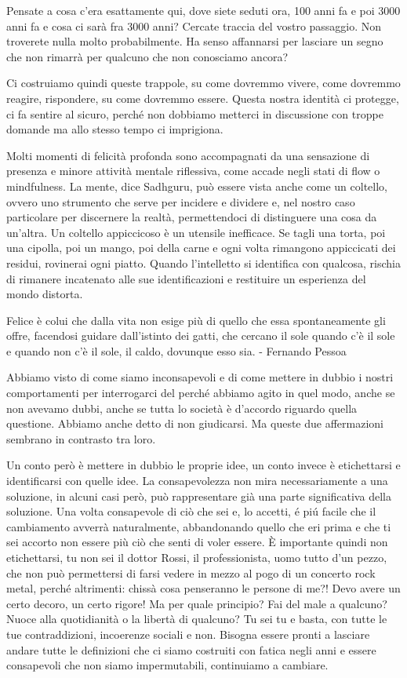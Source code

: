 \documentclass[12pt]{book} %
\begin{document}
\begin{mdframed}[linewidth=1pt]
Pensate a cosa c'era esattamente qui, dove siete seduti ora, 100 anni fa e poi 3000 anni fa e cosa ci sarà fra 3000 anni? Cercate traccia del vostro passaggio. Non troverete nulla molto probabilmente. Ha senso affannarsi per lasciare un segno che non rimarrà per qualcuno che non conosciamo ancora?
\end{mdframed}

Ci costruiamo quindi queste trappole, su come dovremmo vivere, come dovremmo reagire, rispondere, su come dovremmo
essere. Questa nostra identità ci protegge, ci fa sentire al sicuro, perché non dobbiamo metterci in discussione con
troppe domande ma allo stesso tempo ci imprigiona.

Molti momenti di felicità profonda sono accompagnati da una sensazione di presenza e minore attività mentale riflessiva, come accade negli stati di flow o mindfulness. La mente, dice Sadhguru, può essere vista anche come un
coltello, ovvero uno strumento che serve per incidere e dividere e, nel nostro caso particolare per discernere la
realtà, permettendoci di distinguere una cosa da un'altra. Un coltello appiccicoso è un utensile inefficace.
Se tagli una torta, poi una cipolla, poi un mango, poi della carne e ogni volta rimangono appiccicati dei residui,
rovinerai ogni piatto. Quando l'intelletto si identifica con qualcosa, rischia di rimanere incatenato alle
sue identificazioni e restituire un esperienza del mondo distorta.

Felice è colui che dalla vita non esige più di quello che essa spontaneamente gli offre, facendosi guidare dall'istinto
dei gatti, che cercano il sole quando c'è il sole e quando non c'è il sole, il caldo, dovunque esso sia. - Fernando
Pessoa

Abbiamo visto di come siamo inconsapevoli e di come mettere in dubbio i nostri comportamenti per interrogarci del perché abbiamo agito in quel modo, anche se non avevamo dubbi, anche se tutta lo società è
d'accordo riguardo quella questione. Abbiamo anche detto di non giudicarsi. Ma queste due
affermazioni sembrano in contrasto tra loro.

Un conto però è mettere in dubbio le proprie idee, un conto invece è etichettarsi e identificarsi con quelle idee. La
consapevolezza non mira necessariamente a una soluzione, in alcuni casi però, può rappresentare già una parte significativa della soluzione. Una volta consapevole di ciò che sei e, lo accetti, é piú facile che il cambiamento avverrà
naturalmente, abbandonando quello che eri prima e che ti sei accorto non essere più ciò che senti di voler essere. È importante quindi non
etichettarsi, tu non sei il dottor Rossi, il professionista, uomo tutto d'un pezzo, che non può
permettersi di farsi vedere in mezzo al pogo di un concerto rock metal, perché altrimenti: chissà cosa penseranno le
persone di me?! Devo avere un certo decoro, un certo rigore! Ma per quale principio? Fai del male a qualcuno? Nuoce
alla quotidianità o la libertà di qualcuno? Tu sei tu e basta, con tutte le tue contraddizioni, incoerenze sociali e
non. Bisogna essere pronti a lasciare andare tutte le definizioni che ci siamo costruiti con fatica negli anni e essere
consapevoli che non siamo impermutabili, continuiamo a cambiare. 
\end{document}
